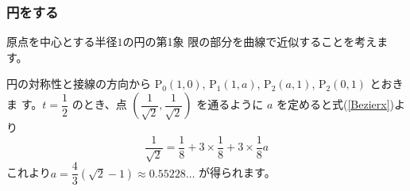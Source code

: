 \subsubsection{円をする}
原点を中心とする半径$1$の円の第1象
限の部分を\Bezier 曲線で近似することを考えます。

円の対称性と接線の方向から
$\textrm{P}_0(1,0)$,
$\textrm{P}_1(1,a)$, $\textrm{P}_2(a,1)$, $\textrm{P}_2(0,1)$ とおきま
す。$t=\dfrac{1}{2}$ のとき、点
$\left(\dfrac{1}{\sqrt{2}},\dfrac{1}{\sqrt{2}}\right)$
を通るように $a$ を定めると式(\ref{Bezierx})より
\[
 \dfrac{1}{\sqrt{2}}=\dfrac{1}{8}+3\times\dfrac{1}{8}+3\times\dfrac{1}{8}a
\]
これより$a=\dfrac{4}{3}\left(\sqrt{2}-1\right)\approx 0.55228\dots$
が得られます。


